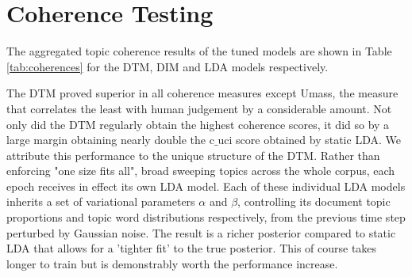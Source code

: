 
\section{Coherence Testing}


The aggregated topic coherence results of the tuned models are shown in Table \ref{tab:coherences} for the DTM, DIM and LDA models respectively.

The DTM proved superior in all coherence measures except Umass, the measure that correlates the least with human judgement by a considerable amount. Not only did the DTM regularly obtain the highest coherence scores, it did so by a large margin obtaining nearly double the c$\_$uci score obtained by static LDA. We attribute this performance to the unique structure of the DTM. Rather than enforcing "one size fits all", broad sweeping topics across the whole corpus, each epoch receives in effect its own LDA model. Each of these individual LDA models inherits a set of variational parameters $\alpha$ and $\beta$, controlling its document topic proportions and topic word distributions respectively, from the previous time step perturbed by Gaussian noise. The result is a richer posterior compared to static LDA that allows for a 'tighter fit' to the true posterior. This of course takes longer to train but is demonstrably worth the performance increase.


